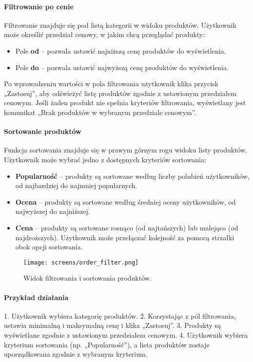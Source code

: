 \documentclass[12pt,a4paper,oneside]{article}
\theoremstyle{definition}
\numberwithin{equation}{section}
\begin{document}
\paragraph{Filtrowanie po cenie}
Filtrowanie znajduje się pod listą kategorii w widoku produktów. Użytkownik może określić przedział cenowy, w jakim chcą przeglądać produkty:
\begin{itemize}
    \item Pole \textbf{od} – pozwala ustawić najniższą cenę produktów do wyświetlenia.
    \item Pole \textbf{do} – pozwala ustawić najwyższą cenę produktów do wyświetlenia.
\end{itemize}
Po wprowadzeniu wartości w pola filtrowania użytkownik klika przycisk „Zastosuj”, aby odświeżyć listę produktów zgodnie z ustawionym przedziałem cenowym. Jeśli żaden produkt nie spełnia kryteriów filtrowania, wyświetlany jest komunikat „Brak produktów w wybranym przedziale cenowym”.

\paragraph{Sortowanie produktów}
Funkcja sortowania znajduje się w prawym górnym rogu widoku listy produktów. Użytkownik może wybrać jedno z dostępnych kryteriów sortowania:
\begin{itemize}
    \item \textbf{Popularność} – produkty są sortowane według liczby polubień użytkowników, od najbardziej do najmniej popularnych.
    \item \textbf{Ocena} – produkty są sortowane według średniej oceny użytkowników, od najwyższej do najniższej.
    \item \textbf{Cena} – produkty są sortowane rosnąco (od najtańszych) lub malejąco (od najdroższych). Użytkownik może przełączać kolejność za pomocą strzałki obok opcji sortowania.
\end{itemize}

\begin{figure}[H]
    \centering
    \texttt{[image: screens/order\_filter.png]}
    \caption{Widok filtrowania i sortowania produktów.}
    \label{fig:order_filter}
\end{figure}

\paragraph{Przykład działania}
1. Użytkownik wybiera kategorię produktów.
2. Korzystając z pól filtrowania, ustawia minimalną i maksymalną cenę i klika „Zastosuj”.
3. Produkty są wyświetlane zgodnie z ustawionym przedziałem cenowym.
4. Użytkownik wybiera kryterium sortowania (np. „Popularność”), a lista produktów zostaje uporządkowana zgodnie z wybranym kryterium.
\end{document}
